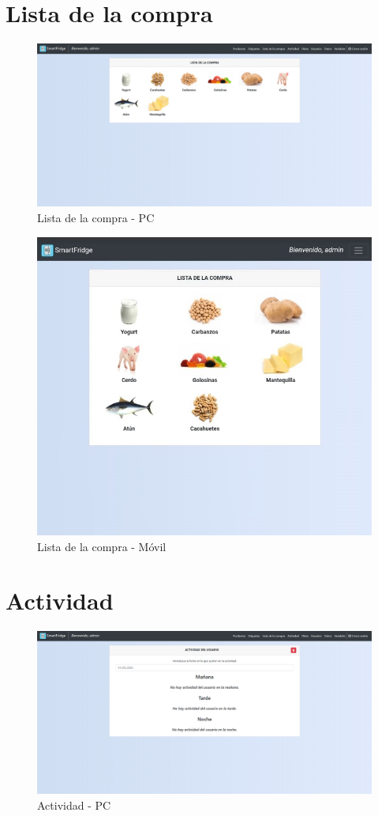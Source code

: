 \section{Lista de la compra}
\begin{figure}[h] 
    \centering
    \includegraphics[width=.90\textwidth]{capitulos/anexotres/PC/ShoppingList.png}
    \caption{Lista de la compra - PC}
    \label{fig:shoppinglistpc}
\end{figure}

\begin{figure}[h] 
    \centering
    \includegraphics[width=.50\textwidth]{capitulos/anexotres/Phone/ShoppingList.jpeg}
    \caption{Lista de la compra - Móvil}
    \label{fig:shoppinglistphone}
\end{figure}

\newpage
\section{Actividad}
\begin{figure}[h] 
    \centering
    \includegraphics[width=.90\textwidth]{capitulos/anexotres/PC/Activity.png}
    \caption{Actividad - PC}
    \label{fig:activitypc}
\end{figure}

